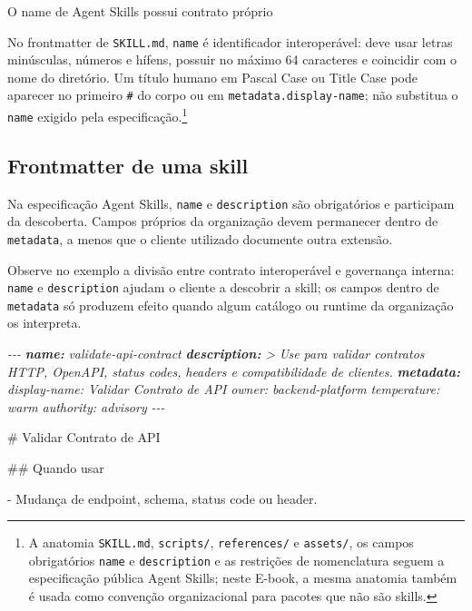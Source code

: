 \documentclass[
  10pt,
  a4paper,
  oneside]{book}
\newenvironment{Shaded}{}{}
\newcommand{\AnnotationTok}[1]{\textcolor[rgb]{0.38,0.63,0.69}{\textbf{\textit{#1}}}}
\newcommand{\CommentTok}[1]{\textcolor[rgb]{0.38,0.63,0.69}{\textit{#1}}}
\newcommand{\FunctionTok}[1]{\textcolor[rgb]{0.02,0.16,0.49}{#1}}
\newcommand{\NormalTok}[1]{#1}
\newcommand{\SpecialStringTok}[1]{\textcolor[rgb]{0.73,0.40,0.53}{#1}}
\begin{document}
\begin{warningbox}{O name de Agent Skills possui contrato próprio}

No frontmatter de \texttt{SKILL.md}, \texttt{name} é identificador
interoperável: deve usar letras minúsculas, números e hífens, possuir no
máximo 64 caracteres e coincidir com o nome do diretório. Um título
humano em Pascal Case ou Title Case pode aparecer no primeiro
\texttt{\#} do corpo ou em \texttt{metadata.display-name}; não substitua
o \texttt{name} exigido pela especificação.\footnote{A anatomia
  \texttt{SKILL.md}, \texttt{scripts/}, \texttt{references/} e
  \texttt{assets/}, os campos obrigatórios \texttt{name} e
  \texttt{description} e as restrições de nomenclatura seguem a
  especificação pública Agent Skills; neste E-book, a mesma anatomia
  também é usada como convenção organizacional para pacotes que não são
  skills.}

\end{warningbox}

\hypertarget{frontmatter-de-uma-skill}{%
\subsection{Frontmatter de uma skill}\label{frontmatter-de-uma-skill}}

Na especificação Agent Skills, \texttt{name} e \texttt{description} são
obrigatórios e participam da descoberta. Campos próprios da organização
devem permanecer dentro de \texttt{metadata}, a menos que o cliente
utilizado documente outra extensão.

Observe no exemplo a divisão entre contrato interoperável e governança
interna: \texttt{name} e \texttt{description} ajudam o cliente a
descobrir a skill; os campos dentro de \texttt{metadata} só produzem
efeito quando algum catálogo ou runtime da organização os interpreta.

\begin{Shaded}
\begin{Highlighting}[]
\CommentTok{{-}{-}{-}}
\AnnotationTok{name:}\CommentTok{ validate{-}api{-}contract}
\AnnotationTok{description:}\CommentTok{ \textgreater{}}
\CommentTok{  Use para validar contratos HTTP, OpenAPI, status codes,}
\CommentTok{  headers e compatibilidade de clientes.}
\AnnotationTok{metadata:}
\CommentTok{  display{-}name: Validar Contrato de API}
\CommentTok{  owner: backend{-}platform}
\CommentTok{  temperature: warm}
\CommentTok{  authority: advisory}
\CommentTok{{-}{-}{-}}

\FunctionTok{\# Validar Contrato de API}

\FunctionTok{\#\# Quando usar}

\SpecialStringTok{{-} }\NormalTok{Mudança de endpoint, schema, status code ou header.}
\end{Highlighting}
\end{Shaded}
\end{document}
